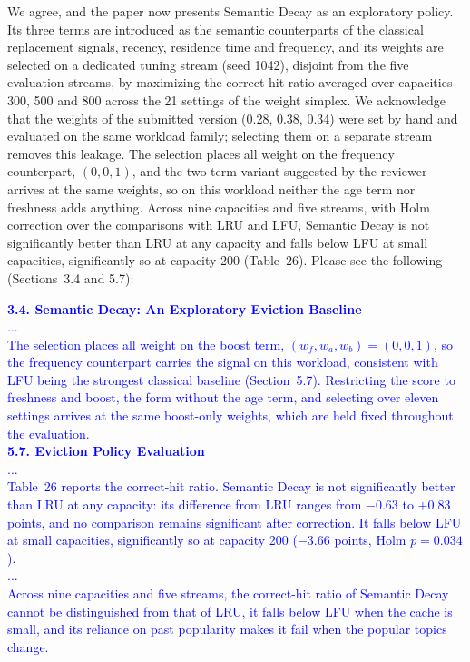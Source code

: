 \documentclass[11pt]{article}
\begin{document}
\begin{enumerate}[leftmargin=*, itemsep=1.2em]
We agree, and the paper now presents Semantic Decay as an exploratory policy. Its three terms are introduced as the semantic counterparts of the classical replacement signals, recency, residence time and frequency, and its weights are selected on a dedicated tuning stream (seed 1042), disjoint from the five evaluation streams, by maximizing the correct-hit ratio averaged over capacities 300, 500 and 800 across the 21 settings of the weight simplex. We acknowledge that the weights of the submitted version (0.28, 0.38, 0.34) were set by hand and evaluated on the same workload family; selecting them on a separate stream removes this leakage. The selection places all weight on the frequency counterpart, $(0,0,1)$, and the two-term variant suggested by the reviewer arrives at the same weights, so on this workload neither the age term nor freshness adds anything. Across nine capacities and five streams, with Holm correction over the comparisons with LRU and LFU, Semantic Decay is not significantly better than LRU at any capacity and falls below LFU at small capacities, significantly so at capacity 200 (Table~26). Please see the following (Sections~3.4 and 5.7):

\textcolor{blue}{\textbf{3.4. Semantic Decay: An Exploratory Eviction Baseline}\\
...\\
The selection places all weight on the boost term, $(w_f,w_a,w_b)=(0,0,1)$, so the frequency counterpart carries the signal on this workload, consistent with LFU being the strongest classical baseline (Section~5.7). Restricting the score to freshness and boost, the form without the age term, and selecting over eleven settings arrives at the same boost-only weights, which are held fixed throughout the evaluation.\\
\textbf{5.7. Eviction Policy Evaluation}\\
...\\
Table~26 reports the correct-hit ratio. Semantic Decay is not significantly better than LRU at any capacity: its difference from LRU ranges from $-0.63$ to $+0.83$ points, and no comparison remains significant after correction. It falls below LFU at small capacities, significantly so at capacity 200 ($-3.66$ points, Holm $p=0.034$).\\
...\\
Across nine capacities and five streams, the correct-hit ratio of Semantic Decay cannot be distinguished from that of LRU, it falls below LFU when the cache is small, and its reliance on past popularity makes it fail when the popular topics change.}


\end{enumerate}
\end{document}

